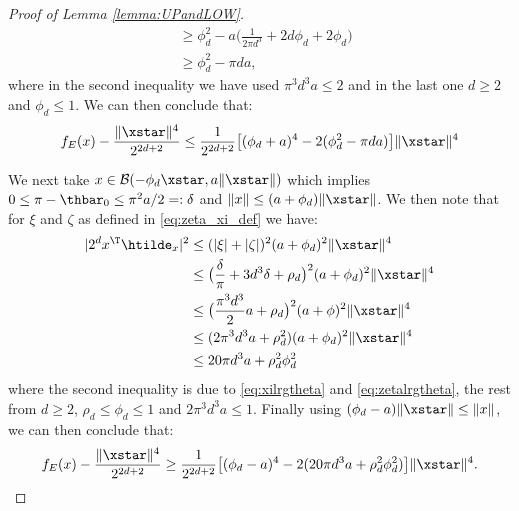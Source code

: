 \begin{proof}[Proof of Lemma \ref{lemma:UPandLOW}]
\[\begin{aligned}
		&\geq \phi_d^2 -  a \big( \frac{1}{2 \pi d^3} +  {2 d \phi_d} + 2 \phi_d  \big) \\
		&\geq \phi_d^2 - \pi d a,
	\end{aligned}
	\]
	where in the second inequality we have used $\pi^3 d^3 a \leq 2$ and in the last  one $d \geq 2$ and $\phi_d \leq 1$.
	We can then conclude that:
	\[
	f_E(x) - \frac{\|\xstar\|^4}{2^{2d+2}}  \leq \frac{1}{2^{2d+2}} \big[ (\phi_d + a)^4 - 2  (\phi_d^2 - \pi d a) \big]\|\xstar\|^4 %
	\]
	
	We next take $x \in \mathcal{B}(- \phi_d \xstar, a \|\xstar\|)$ which implies $0 \leq \pi - \thbar_0 \leq \pi^2 a /2 =: \delta $ and $\|x\| \leq (a + \phi_d) \|\xstar\|$. We then note that for 
	$\xi$ and $\zeta$ as defined in \eqref{eq:zeta_xi_def} we have:
	\[
	\begin{aligned}
	|2^d x^\T \htilde_x|^2 &\leq (|\xi| + |\zeta|)^2 (a + \phi_d)^2 \|\xstar\|^4 \\
	&\leq \big(\frac{\delta}{\pi} + 3 d^3 \delta + \rho_d \big)^2 (a + \phi_d)^2 \|\xstar\|^4 \\ 
	&\leq \big( \frac{\pi^3 d^3}{2} a+ \rho_d \big)^2 (a + \phi)^2 \|\xstar\|^4 \\
	&\leq ( 2 \pi^3 d^3 a + \rho_d^2 ) (a + \phi_d)^2 \|\xstar\|^4 \\
	&\leq 20 \pi d^3 a + \rho_d^2 \phi_d^2		
	\end{aligned}
	\]
	where the second inequality is due to \eqref{eq:xilrgtheta} and \eqref{eq:zetalrgtheta}, the rest  from $d \geq 2$, $ \rho_d \leq \phi_d \leq 1$ and  $2 \pi^3 d^3 a \leq 1$.
	Finally using $(\phi_d - a) \|\xstar\|\leq \|x\|$, we can then conclude that:
	\[
	f_E(x) - \frac{\|\xstar\|^4}{2^{2d+2}}  \geq \frac{1}{2^{2d+2}} \big[ (\phi_d - a)^4 - 2 (20 \pi d^3 a + \rho_d^2 \phi_d^2) \big] \|\xstar\|^4.
	\]  
\end{proof}
